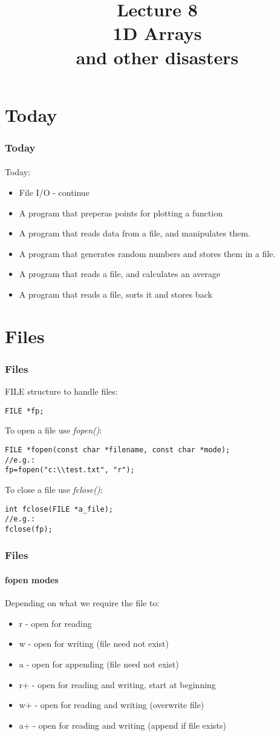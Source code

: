 \documentclass[10pt]{beamer}
\title{Lecture 8\\1D Arrays\\{\tiny and other disasters}}
\date{}
\begin{document}
\frame{
    \titlepage
}

\section{Today}
\begin{frame}
  \frametitle{Today}
  \framesubtitle{}
  
  Today:
  \begin{itemize}
		\item File I/O - continue
		\item A program that preperas points for plotting a function
		\item A program that reads data from a file, and manipulates them.
		\item A program that generates random numbers and stores them in a file.
		\item A program that reads a file, and calculates an average
		\item A program that reads a file, sorts it and stores back
  \end{itemize}
\end{frame}

\section{Files}

\begin{frame}[fragile]
  \frametitle{Files}
FILE structure to handle files:
\begin{lstlisting}
FILE *fp;
\end{lstlisting}

To open a file use \textit{fopen()}:
\begin{lstlisting}
FILE *fopen(const char *filename, const char *mode);
//e.g.:
fp=fopen("c:\\test.txt", "r");
\end{lstlisting}

To close a file use \textit{fclose()}:
\begin{lstlisting}
int fclose(FILE *a_file);
//e.g.:
fclose(fp);
\end{lstlisting}
 
\end{frame}

\begin{frame}[fragile]
  \frametitle{Files}
  \framesubtitle{fopen modes}
  Depending on what we require the file to:
\begin{itemize}
	\item r  - open for reading
	\item w  - open for writing (file need not exist)
	\item a  - open for appending (file need not exist)
	\item r+ - open for reading and writing, start at beginning
	\item w+ - open for reading and writing (overwrite file)
	\item a+ - open for reading and writing (append if file exists)
\end{itemize}



\end{frame}
\end{document}
